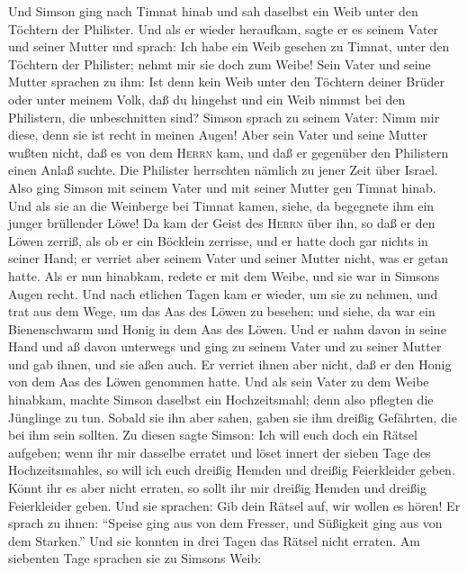  Und Simson ging nach Timnat hinab und sah daselbst ein
Weib unter den Töchtern der Philister.  Und als er wieder
heraufkam, sagte er es seinem Vater und seiner Mutter und sprach: Ich
habe ein Weib gesehen zu Timnat, unter den Töchtern der Philister; nehmt
mir sie doch zum Weibe!  Sein Vater und seine Mutter
sprachen zu ihm: Ist denn kein Weib unter den Töchtern deiner Brüder
oder unter meinem Volk, daß du hingehst und ein Weib nimmst bei den
Philistern, die unbeschnitten sind? Simson sprach zu seinem Vater: Nimm
mir diese, denn sie ist recht in meinen Augen!  Aber sein
Vater und seine Mutter wußten nicht, daß es von dem \textsc{Herrn} kam,
und daß er gegenüber den Philistern einen Anlaß suchte. Die Philister
herrschten nämlich zu jener Zeit über Israel.  Also ging
Simson mit seinem Vater und mit seiner Mutter gen Timnat hinab. Und als
sie an die Weinberge bei Timnat kamen, siehe, da begegnete ihm ein
junger brüllender Löwe!  Da kam der Geist des
\textsc{Herrn} über ihn, so daß er den Löwen zerriß, als ob er ein
Böcklein zerrisse, und er hatte doch gar nichts in seiner Hand; er
verriet aber seinem Vater und seiner Mutter nicht, was er getan hatte.
 Als er nun hinabkam, redete er mit dem Weibe, und sie war
in Simsons Augen recht.  Und nach etlichen Tagen kam er
wieder, um sie zu nehmen, und trat aus dem Wege, um das Aas des Löwen zu
besehen; und siehe, da war ein Bienenschwarm und Honig in dem Aas des
Löwen.  Und er nahm davon in seine Hand und aß davon
unterwegs und ging zu seinem Vater und zu seiner Mutter und gab ihnen,
und sie aßen auch. Er verriet ihnen aber nicht, daß er den Honig von dem
Aas des Löwen genommen hatte.  Und als sein Vater zu dem
Weibe hinabkam, machte Simson daselbst ein Hochzeitsmahl; denn also
pflegten die Jünglinge zu tun.  Sobald sie ihn aber
sahen, gaben sie ihm dreißig Gefährten, die bei ihm sein sollten.
 Zu diesen sagte Simson: Ich will euch doch ein Rätsel
aufgeben; wenn ihr mir dasselbe erratet und löset innert der sieben Tage
des Hochzeitsmahles, so will ich euch dreißig Hemden und dreißig
Feierkleider geben.  Könnt ihr es aber nicht erraten, so
sollt ihr mir dreißig Hemden und dreißig Feierkleider geben. Und sie
sprachen: Gib dein Rätsel auf, wir wollen es hören!  Er
sprach zu ihnen: ``Speise ging aus von dem Fresser, und Süßigkeit ging
aus von dem Starken.'' Und sie konnten in drei Tagen das Rätsel nicht
erraten.  Am siebenten Tage sprachen sie zu Simsons Weib:
